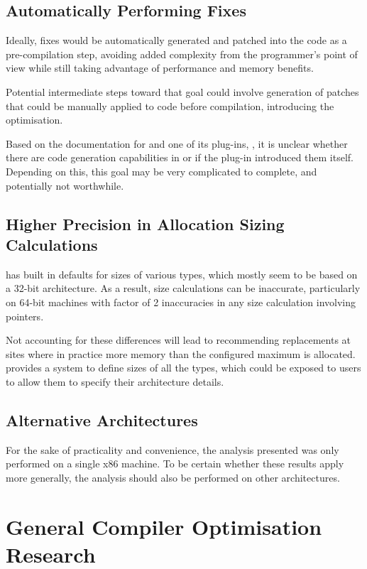 \subsection{Automatically Performing Fixes}

Ideally, fixes would be automatically generated and patched into the code as a pre-compilation step, avoiding added complexity from the programmer's point of view while still taking advantage of performance and memory benefits.

Potential intermediate steps toward that goal could involve generation of patches that could be manually applied to code before compilation, introducing the optimisation.

Based on the documentation for  and one of its plug-ins, , it is unclear whether there are code generation capabilities in  or if the plug-in introduced them itself. Depending on this, this goal may be very complicated to complete, and potentially not worthwhile.

\subsection{Higher Precision in Allocation Sizing Calculations}

 has built in defaults for sizes of various types, which mostly seem to be based on a 32-bit architecture. As a result, size calculations can be inaccurate, particularly on 64-bit machines with factor of 2 inaccuracies in any size calculation involving pointers.

Not accounting for these differences will lead to  recommending replacements at sites where in practice more memory than the configured maximum is allocated.  provides a system to define sizes of all the types, which could be exposed to users to allow them to specify their architecture details.

\subsection{Alternative Architectures}

For the sake of practicality and convenience, the analysis presented was only performed on a single x86 machine. To be certain whether these results apply more generally, the analysis should also be performed on other architectures.

\section{General Compiler Optimisation Research}


